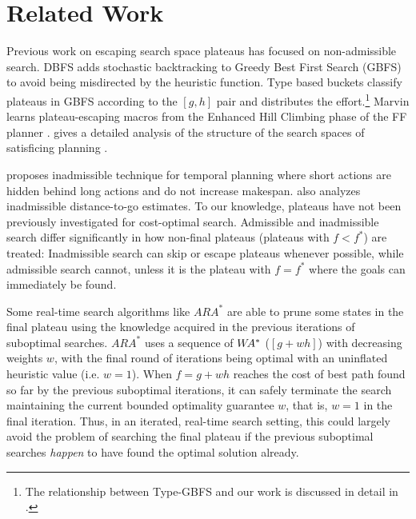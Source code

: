 \chapter{Related Work}

Previous work on escaping search space plateaus has focused on
non-admissible search.  DBFS \cite{imai2011novel} %
adds stochastic backtracking to Greedy Best First Search (GBFS) to avoid
being misdirected by the heuristic function. Type based buckets
\cite{xie14type} classify plateaus in GBFS according to the
$[g,h]$ pair and distributes the effort.\footnote{The relationship between Type-GBFS and our work is discussed in detail in .}  Marvin \cite{Coles07} learns plateau-escaping macros
from the Enhanced Hill Climbing phase of the FF planner
\cite{hoffmann01}. %
\citeauthor{Hoffmann05}  gives a detailed analysis of the
structure of the search spaces of satisficing planning \citeyear{Hoffmann05,Hoffmann11}.

 \citeauthor{benton2010g} \citeyear{benton2010g} proposes inadmissible technique for temporal planning
 where short actions are hidden behind long actions and do not increase makespan.
 \citeauthor{wilt2011cost} \citeyear{wilt2011cost} also analyzes inadmissible distance-to-go estimates.
% 
To our knowledge, plateaus have not been previously investigated for cost-optimal search.
Admissible and inadmissible search differ significantly in how non-final plateaus (plateaus with $f < f^*$) are treated:
Inadmissible search can skip or escape plateaus whenever possible, while
admissible search cannot, unless it is the plateau with $f=f^*$ where the goals can immediately be found.

Some real-time search algorithms like $ARA^*$ \cite{likhachev2008anytime} are able to prune some states in the final plateau using the knowledge acquired in the previous iterations of suboptimal searches. $ARA^*$ uses a sequence of $W\hspace{-0.2em}A^*$ ($[g+wh]$) with decreasing weights $w$, with the final round of iterations being optimal \astar with an uninflated heuristic value (i.e. $w=1$). When $f=g+wh$ reaches the cost of best path found so far by the previous suboptimal iterations, it can safely terminate the search maintaining the current bounded optimality guarantee $w$, that is, $w=1$ in the final iteration. Thus, in an iterated, real-time search setting, this could largely avoid the problem of searching the final plateau if the previous suboptimal searches \emph{happen} to have found the optimal solution already. 

